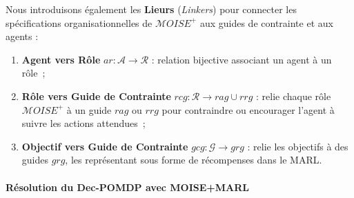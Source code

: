 \vspace{0.8em}

\noindent Nous introduisons également les \textbf{Lieurs} (\textit{Linkers}) pour connecter les spécifications organisationnelles de $\mathcal{M}OISE^+$ aux guides de contrainte et aux agents :

\begin{enumerate}[label={\roman*) },itemjoin={; \quad}]
    \item \textbf{Agent vers Rôle} \quad $ar: \mathcal{A} \to \mathcal{R}$ : relation bijective associant un agent à un rôle~;

    \item \textbf{Rôle vers Guide de Contrainte} \quad $rcg: \mathcal{R} \rightarrow rag \cup rrg$ : relie chaque rôle $\mathcal{M}OISE^+$ à un guide $rag$ ou $rrg$ pour contraindre ou encourager l'agent à suivre les actions attendues~;

    \item \textbf{Objectif vers Guide de Contrainte} \quad $gcg: \mathcal{G} \rightarrow grg$ : relie les objectifs à des guides $grg$, les représentant sous forme de récompenses dans le MARL.
\end{enumerate}

\paragraph{\textbf{Résolution du Dec-POMDP avec MOISE+MARL}}

